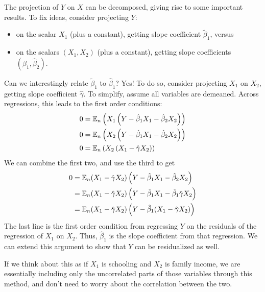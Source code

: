 \documentclass[10pt]{article}
\begin{document}
\begin{example}
	 The projection of $Y$ on $X$ can be decomposed, giving rise to some important results. To fix ideas, consider projecting $Y$:
	\begin{itemize}
		\item on the scalar $X_1$ (plus a constant), getting slope coefficient $\tilde{\beta}_1$, versus
		\item on the scalars $(X_1,X_2)$ (plus a constant), getting slope coefficients $(\hat{\beta}_1,\hat{\beta}_2)$.
	\end{itemize}
	Can we interestingly relate $\tilde{\beta}_1$ to $\hat{\beta}_1$? Yes! To do so, consider projecting $X_1$ on $X_2$, getting slope coefficient $\hat{\gamma}$. To simplify, assume all variables are demeaned. Across regressions, this leads to the first order conditions:
	\begin{align*}
		0 &= \mathbb{E}_n \left( X_1 \left( Y - \hat{\beta}_1X_1 - \hat{\beta}_2X_2\right)\right) \\
		0 &= \mathbb{E}_n \left( X_2 \left( Y - \hat{\beta}_1X_1 - \hat{\beta}_2X_2\right)\right) \\
		0 &= \mathbb{E}_n \left( X_2 \left( X_1 - \hat{\gamma}X_2\right)\right) \\
	\end{align*}
	We can combine the first two, and use the third to get
	\begin{align*}
		0 &= \mathbb{E}_n (X_1 - \hat{\gamma}X_2)\left( Y - \hat{\beta}_1X_1 - \hat{\beta}_2X_2\right) \\
		&= \mathbb{E}_n (X_1 - \hat{\gamma}X_2)\left( Y - \hat{\beta}_1X_1 - \hat{\beta}_1 \hat{\gamma}X_2\right) \\
		&= \mathbb{E}_n (X_1 - \hat{\gamma}X_2)\left( Y - \hat{\beta}_1 (X_1 - \hat{\gamma}X_2)\right)
	\end{align*}
	The last line is the first order condition from regressing $Y$ on the residuals of the regression of $X_1$ on $X_2$. Thus, $\hat{\beta}_1$ is the slope coefficient from that regression. We can extend this argument to show that $Y$ can be residualized as well.
	
	\begin{remark}
		If we think about this as if $X_1$ is schooling and $X_2$ is family income, we are essentially including only the uncorrelated parts of those variables through this method, and don't need to worry about the correlation between the two.
	\end{remark}
	

\end{example}
\end{document}
